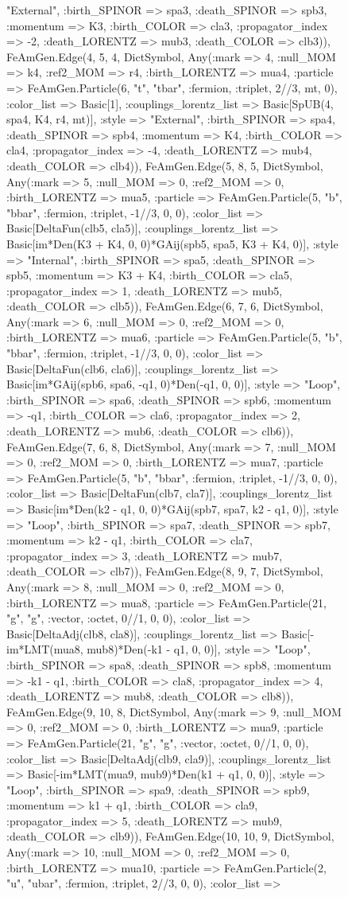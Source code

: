 \documentclass{revtex4}
\begin{document}
\begin{figure}[!htb]
\begin{center}
{"External", :birth_SPINOR => spa3, :death_SPINOR => spb3, :momentum => K3, :birth_COLOR => cla3, :propagator_index => -2, :death_LORENTZ => mub3, :death_COLOR => clb3)), FeAmGen.Edge(4, 5, 4, Dict{Symbol, Any}(:mark => 4, :null_MOM => k4, :ref2_MOM => r4, :birth_LORENTZ => mua4, :particle => FeAmGen.Particle(6, "t", "tbar", :fermion, :triplet, 2//3, mt, 0), :color_list => Basic[1], :couplings_lorentz_list => Basic[SpUB(4, spa4, K4, r4, mt)], :style => "External", :birth_SPINOR => spa4, :death_SPINOR => spb4, :momentum => K4, :birth_COLOR => cla4, :propagator_index => -4, :death_LORENTZ => mub4, :death_COLOR => clb4)), FeAmGen.Edge(5, 8, 5, Dict{Symbol, Any}(:mark => 5, :null_MOM => 0, :ref2_MOM => 0, :birth_LORENTZ => mua5, :particle => FeAmGen.Particle(5, "b", "bbar", :fermion, :triplet, -1//3, 0, 0), :color_list => Basic[DeltaFun(clb5, cla5)], :couplings_lorentz_list => Basic[im*Den(K3 + K4, 0, 0)*GAij(spb5, spa5, K3 + K4, 0)], :style => "Internal", :birth_SPINOR => spa5, :death_SPINOR => spb5, :momentum => K3 + K4, :birth_COLOR => cla5, :propagator_index => 1, :death_LORENTZ => mub5, :death_COLOR => clb5)), FeAmGen.Edge(6, 7, 6, Dict{Symbol, Any}(:mark => 6, :null_MOM => 0, :ref2_MOM => 0, :birth_LORENTZ => mua6, :particle => FeAmGen.Particle(5, "b", "bbar", :fermion, :triplet, -1//3, 0, 0), :color_list => Basic[DeltaFun(clb6, cla6)], :couplings_lorentz_list => Basic[im*GAij(spb6, spa6, -q1, 0)*Den(-q1, 0, 0)], :style => "Loop", :birth_SPINOR => spa6, :death_SPINOR => spb6, :momentum => -q1, :birth_COLOR => cla6, :propagator_index => 2, :death_LORENTZ => mub6, :death_COLOR => clb6)), FeAmGen.Edge(7, 6, 8, Dict{Symbol, Any}(:mark => 7, :null_MOM => 0, :ref2_MOM => 0, :birth_LORENTZ => mua7, :particle => FeAmGen.Particle(5, "b", "bbar", :fermion, :triplet, -1//3, 0, 0), :color_list => Basic[DeltaFun(clb7, cla7)], :couplings_lorentz_list => Basic[im*Den(k2 - q1, 0, 0)*GAij(spb7, spa7, k2 - q1, 0)], :style => "Loop", :birth_SPINOR => spa7, :death_SPINOR => spb7, :momentum => k2 - q1, :birth_COLOR => cla7, :propagator_index => 3, :death_LORENTZ => mub7, :death_COLOR => clb7)), FeAmGen.Edge(8, 9, 7, Dict{Symbol, Any}(:mark => 8, :null_MOM => 0, :ref2_MOM => 0, :birth_LORENTZ => mua8, :particle => FeAmGen.Particle(21, "g", "g", :vector, :octet, 0//1, 0, 0), :color_list => Basic[DeltaAdj(clb8, cla8)], :couplings_lorentz_list => Basic[-im*LMT(mua8, mub8)*Den(-k1 - q1, 0, 0)], :style => "Loop", :birth_SPINOR => spa8, :death_SPINOR => spb8, :momentum => -k1 - q1, :birth_COLOR => cla8, :propagator_index => 4, :death_LORENTZ => mub8, :death_COLOR => clb8)), FeAmGen.Edge(9, 10, 8, Dict{Symbol, Any}(:mark => 9, :null_MOM => 0, :ref2_MOM => 0, :birth_LORENTZ => mua9, :particle => FeAmGen.Particle(21, "g", "g", :vector, :octet, 0//1, 0, 0), :color_list => Basic[DeltaAdj(clb9, cla9)], :couplings_lorentz_list => Basic[-im*LMT(mua9, mub9)*Den(k1 + q1, 0, 0)], :style => "Loop", :birth_SPINOR => spa9, :death_SPINOR => spb9, :momentum => k1 + q1, :birth_COLOR => cla9, :propagator_index => 5, :death_LORENTZ => mub9, :death_COLOR => clb9)), FeAmGen.Edge(10, 10, 9, Dict{Symbol, Any}(:mark => 10, :null_MOM => 0, :ref2_MOM => 0, :birth_LORENTZ => mua10, :particle => FeAmGen.Particle(2, "u", "ubar", :fermion, :triplet, 2//3, 0, 0), :color_list => }
\end{center}
\end{figure}
\end{document}

